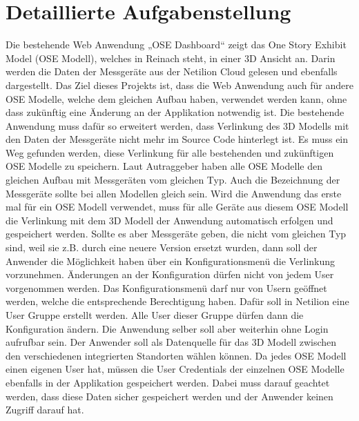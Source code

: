 \section{Detaillierte Aufgabenstellung}

Die bestehende Web Anwendung „OSE Dashboard“ zeigt das One Story Exhibit Model (OSE Modell), welches in Reinach steht, in einer 3D Ansicht an. Darin werden die Daten der Messgeräte aus der Netilion Cloud gelesen und ebenfalls dargestellt.
\newline
Das Ziel dieses Projekts ist, dass die Web Anwendung auch für andere OSE Modelle, welche dem gleichen Aufbau haben, verwendet werden kann, ohne dass zukünftig eine Änderung an der Applikation notwendig ist.
\newline
Die bestehende Anwendung muss dafür so erweitert werden, dass Verlinkung des 3D Modells mit den Daten der Messgeräte nicht mehr im Source Code hinterlegt ist. Es muss ein Weg gefunden werden, diese Verlinkung für alle bestehenden und zukünftigen OSE Modelle zu speichern.
\newline
Laut Autraggeber haben alle OSE Modelle den gleichen Aufbau mit Messgeräten vom gleichen Typ. Auch die Bezeichnung der Messgeräte sollte bei allen Modellen gleich sein. Wird die Anwendung das erste mal für ein OSE Modell verwendet, muss für alle Geräte aus diesem OSE Modell die Verlinkung mit dem 3D Modell der Anwendung automatisch erfolgen und gespeichert werden. Sollte es aber Messgeräte geben, die nicht vom gleichen Typ sind, weil sie z.B. durch eine neuere Version ersetzt wurden, dann soll der Anwender die Möglichkeit haben über ein Konfigurationsmenü die Verlinkung vorzunehmen.
\newline
Änderungen an der Konfiguration dürfen nicht von jedem User vorgenommen werden. Das Konfigurationsmenü darf nur von Usern geöffnet werden, welche die entsprechende Berechtigung haben. Dafür soll in Netilion eine User Gruppe erstellt werden. Alle User dieser Gruppe dürfen dann die Konfiguration ändern.
\newline
Die Anwendung selber soll aber weiterhin ohne Login aufrufbar sein. Der Anwender soll als Datenquelle für das 3D Modell zwischen den verschiedenen integrierten Standorten wählen können. Da jedes OSE Modell einen eigenen User hat, müssen die User Credentials der einzelnen OSE Modelle ebenfalls in der Applikation gespeichert werden. Dabei muss darauf geachtet werden, dass diese Daten sicher gespeichert werden und der Anwender keinen Zugriff darauf hat.
\newline
